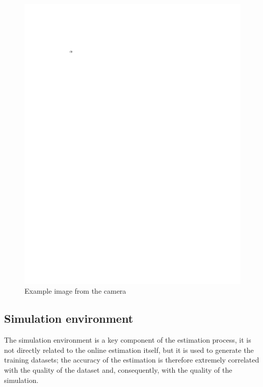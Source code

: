 \documentclass[a4paper,12pt,sort&compress]{article}
\begin{document}
    \begin{figure}
        \centering
        \includegraphics[width=0.8\linewidth]{a.pdf}
        \caption{Example image from the camera}
        \label{fig:camera_example}
    \end{figure}
    

    \subsection{Simulation environment}
    The simulation environment is a key component of the estimation process, it
    is not directly related to the online estimation itself, but it is used to
    generate the training datasets; the accuracy of the estimation is therefore
    extremely correlated with the quality of the dataset and, consequently, with
    the quality of the simulation. 
\end{document}
